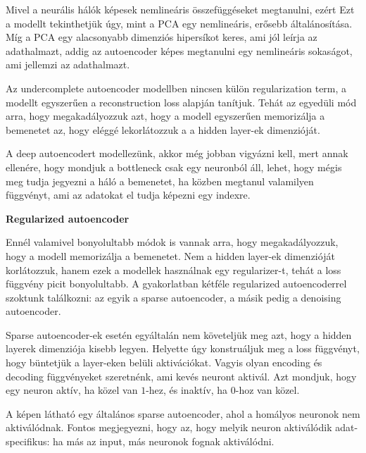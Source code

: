 \documentclass[12pt]{amsart}
\begin{document}
Mivel a neurális hálók képesek nemlineáris összefüggéseket
megtanulni, ezért Ezt a modellt tekinthetjük úgy, mint a PCA
egy nemlineáris, erősebb általánosítása. Míg a PCA egy
alacsonyabb dimenziós hipersíkot keres, ami jól leírja az
adathalmazt, addig az autoencoder képes megtanulni egy
nemlineáris sokaságot, ami jellemzi az adathalmazt. 

\vspace{5pt}

Az undercomplete autoencoder modellben nincsen külön
regularization term, a modellt egyszerűen a reconstruction
loss alapján tanítjuk. Tehát az egyedüli mód arra, hogy
megakadályozzuk azt, hogy a modell egyszerűen memorizálja a
bemenetet az, hogy eléggé lekorlátozzuk a a hidden layer-ek
dimenzióját.

\vspace{5pt}

A deep autoencodert modellezünk, akkor még jobban vigyázni
kell, mert annak ellenére, hogy mondjuk a bottleneck csak
egy neuronból áll, lehet, hogy mégis meg tudja jegyezni a
háló a bemenetet, ha közben megtanul valamilyen függvényt,
ami az adatokat el tudja képezni egy indexre.

\vspace{10pt}

\textbf{Regularized autoencoder}

\vspace{10pt}

Ennél valamivel bonyolultabb módok is vannak arra, hogy
megakadályozzuk, hogy a modell memorizálja a bemenetet. Nem
a hidden layer-ek dimenzióját korlátozzuk, hanem ezek a
modellek használnak egy regularizer-t, tehát a loss függvény
picit bonyolultabb. A gyakorlatban kétféle regularized
autoencoderrel szoktunk találkozni: az egyik a sparse
autoencoder, a másik pedig a denoising autoencoder.

\vspace{5pt}

Sparse autoencoder-ek esetén egyáltalán nem követeljük meg
azt, hogy a hidden layerek dimenziója kisebb
legyen. Helyette úgy konstruáljuk meg a loss függvényt, hogy
büntetjük a layer-eken belüli aktivációkat. Vagyis olyan
encoding és decoding függvényeket szeretnénk, ami kevés
neuront aktivál. Azt mondjuk, hogy egy neuron aktív, ha
közel van $1$-hez, és inaktív, ha $0$-hoz van közel. 

\vspace{5pt}

A képen látható egy általános sparse autoencoder, ahol a
homályos neuronok nem aktiválódnak. Fontos megjegyezni, hogy
az, hogy melyik neuron aktiválódik adat-specifikus: ha más
az input, más neuronok fognak aktiválódni.
\end{document}
